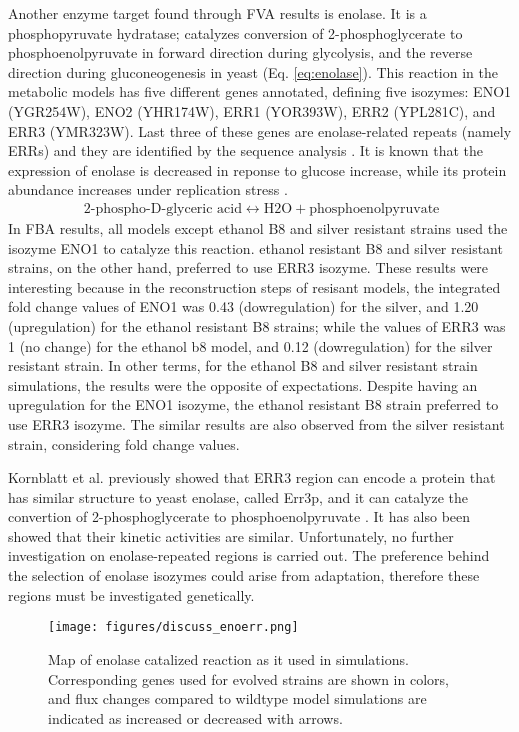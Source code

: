 Another enzyme target found through FVA results is enolase. It is a phosphopyruvate hydratase; catalyzes conversion of 2-phosphoglycerate to phosphoenolpyruvate in forward direction during glycolysis, and the reverse direction during gluconeogenesis in yeast (Eq. \ref{eq:enolase}). This reaction in the metabolic models has five different genes annotated, defining five isozymes: ENO1 (YGR254W), ENO2 (YHR174W), ERR1 (YOR393W), ERR2 (YPL281C), and ERR3 (YMR323W). Last three of these genes are enolase-related repeats (namely ERRs) and they are identified by the sequence analysis \cite{pryde1995sequence}. It is known that the expression of enolase is decreased in reponse to glucose increase, while its protein abundance increases under replication stress \cite{tkach2012dissecting}.
\begin{align}
  \label{eq:enolase}
  \ \text{2-phospho-D-glyceric acid} \leftrightarrow \text{H2O} + \text{phosphoenolpyruvate}
\end{align}
In FBA results, all models except ethanol B8 and silver resistant strains used the isozyme ENO1 to catalyze this reaction. ethanol resistant B8 and silver resistant strains, on the other hand, preferred to use ERR3 isozyme. These results were interesting because in the reconstruction steps of resisant models, the integrated fold change values of ENO1 was 0.43 (dowregulation) for the silver, and 1.20 (upregulation) for the ethanol resistant B8 strains; while the values of ERR3 was 1 (no change) for the ethanol b8 model, and 0.12 (dowregulation) for the silver resistant strain. In other terms, for the ethanol B8 and silver resistant strain simulations, the results were the opposite of expectations. Despite having an upregulation for the ENO1 isozyme, the ethanol resistant B8 strain preferred to use ERR3 isozyme. The similar results are also observed from the silver resistant strain, considering fold change values.

Kornblatt et al. previously showed that ERR3 region can encode a protein that has similar structure to yeast enolase, called Err3p, and it can catalyze the convertion of 2-phosphoglycerate to phosphoenolpyruvate \cite{kornblatt2013saccharomyces}. It has also been showed that their kinetic activities are similar. Unfortunately, no further investigation on enolase-repeated regions is carried out. The preference behind the selection of enolase isozymes could arise from adaptation, therefore these regions must be investigated genetically.

\begin{figure}[H]
\texttt{[image: figures/discuss\_enoerr.png]}
\caption[Map of enolase catalized reaction as it used in simulations]{Map of enolase catalized reaction as it used in simulations. Corresponding genes used for evolved strains are shown in colors, and flux changes compared to wildtype model simulations are indicated as increased or decreased with arrows.}
\label{fig:discuss_ENOERR}
\end{figure}

